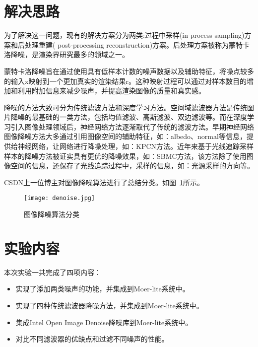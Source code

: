 \documentclass[lang=cn,10pt]{elegantbook}
\begin{document}
\section{解决思路}
为了解决这一问题，现有的解决方案分为两类:过程中采样(in-process sampling)方案和后处理重建( post-processing reconstruction)方案\cite{huo2021survey}。后处理方案被称为蒙特卡洛降噪，是渲染界研究最多的领域之一。

蒙特卡洛降噪旨在通过使用具有低样本计数的噪声数据以及辅助特征，将噪点较多的输入x映射到一个更加真实的渲染结果r。这种映射过程可以通过对样本数目的增加和利用附加信息来减少噪声，并提高渲染图像的质量和真实感\cite{huo2021survey}。

降噪的方法大致可分为传统滤波方法和深度学习方法。空间域滤波器方法是传统图片降噪的最基础的一类方法，包括均值滤波、高斯滤波、双边滤波等。而在深度学习引入图像处理领域后，神经网络方法逐渐取代了传统的滤波方法。早期神经网络图像降噪方法大多通过引用图像空间的辅助特征，如：albedo、normal等信息，提供给神经网络，让网络进行降噪处理，如：KPCN方法\cite{bako2017kernelpredicting}。近年来基于光线追踪采样样本的降噪方法被证实具有更优的降噪效果，如：SBMC方法\cite{gharbi2019samplebased}，该方法除了使用图像空间的信息，还保存了光线追踪过程中，采样的信息，如：光源采样的方向等。

CSDN上一位博主\cite{csdn_blog}对图像降噪算法进行了总结分类。如图~\ref{fig:example}所示。

\begin{figure}
  \centering
  \texttt{[image: denoise.jpg]}
  \caption{图像降噪算法分类}
  \label{fig:example}
\end{figure}


\section{实验内容}
本次实验一共完成了四项内容：
\begin{itemize}
\item 实现了添加两类噪声的功能，并集成到Moer-lite系统中。
\item 实现了四种传统滤波器降噪方法，并集成到Moer-lite系统中。
\item 集成Intel Open Image Denoise降噪库到Moer-lite系统中。
\item 对比不同滤波器的优缺点和过滤不同噪声的性能。
\end{itemize}
\end{document}
